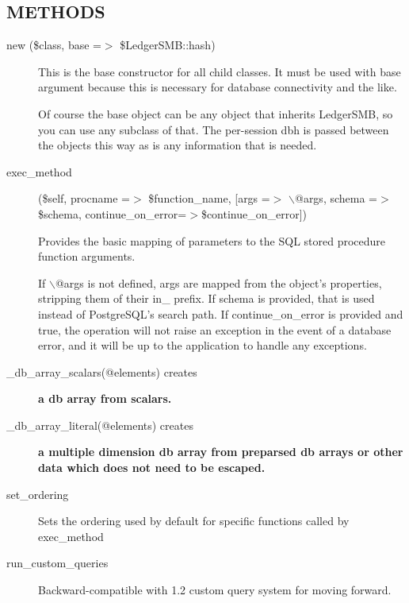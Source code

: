 \begin{description}
\begin{description}
\begin{description}
\begin{description}
\begin{description}
\subsection*{METHODS\label{LedgerSMB::DBObject_METHODS}}
\begin{description}

\item[{new (\$class, base =$>$ \$LedgerSMB::hash)}] \mbox{}

This is the base constructor for all child classes.  It must be used with base
argument because this is necessary for database connectivity and the like.



Of course the base object can be any object that inherits LedgerSMB, so you can
use any subclass of that.  The per-session dbh is passed between the objects 
this way as is any information that is needed.


\item[{exec\_method}] \mbox{}

(\$self, procname =$>$ \$function\_name, [args =$>$ $\backslash$@args, schema =$>$ \$schema,
continue\_on\_error=$>$\$continue\_on\_error])



Provides the basic mapping of parameters to the SQL stored procedure function 
arguments.



If $\backslash$@args is not defined, args are mapped from the object's properties, 
stripping them of their in\_ prefix.  If schema is provided, that is used 
instead of PostgreSQL's search path.  If continue\_on\_error is provided and true,
the operation will not raise an exception in the event of a database error, and 
it will be up to the application to handle any exceptions.


\item[{\_db\_array\_scalars(@elements) creates}] \textbf{a db array from scalars.}
\item[{\_db\_array\_literal(@elements) creates}] \textbf{a multiple dimension db array from 	preparsed db arrays or other data which does not need to be escaped.}
\item[{set\_ordering}] \mbox{}

Sets the ordering used by default for specific functions called by exec\_method


\item[{run\_custom\_queries}] \mbox{}

Backward-compatible with 1.2 custom query system for moving forward.


\end{description}
\end{description}
\end{description}
\end{description}
\end{description}
\end{description}
